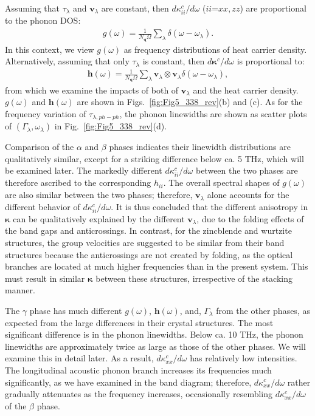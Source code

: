 \documentclass[twocolumn,amsmath,amssymb,a4paper,prb,superscriptaddress,floatfix]{revtex4-1}
\begin{document}
Assuming that $\tau_\lambda$ and $\mathbf{v}_\lambda$ are constant, then
$d\kappa_{ii}^c/d\omega$ ($ii$=$xx,zz$) are proportional to the phonon
DOS: 
\begin{align}
 \label{eq:dos}
 g(\omega) = \frac{1}{N_\mathbf{q}\Omega}
 \sum_\lambda
 \delta(\omega-\omega_{\lambda}).
\end{align}
In this context, we view $g(\omega)$ as frequency distributions of heat
carrier density. Alternatively, assuming that only $\tau_\lambda$ is constant,
then $d\boldsymbol{\kappa}^c/d\omega$ is proportional to:
\begin{align}
 \label{eq:wdos}
 \boldsymbol{h}(\omega) = \frac{1}{N_\mathbf{q}\Omega}
 \sum_\lambda
 \mathbf{v}_\lambda \otimes \mathbf{v}_\lambda
 \delta(\omega-\omega_{\lambda}),
\end{align}
from which we examine the impacts of both of $\mathbf{v}_\lambda$ and the heat carrier
density. $g(\omega)$ and  $\boldsymbol{h}(\omega)$
are shown in
Figs.~\ref{fig:Fig5_338_rev}(b) and (c). As for the frequency
variation of $\tau_{\lambda,ph-ph}$, the phonon linewidths are shown as scatter
plots of $(\Gamma_\lambda,\omega_\lambda)$ in Fig.~\ref{fig:Fig5_338_rev}(d).

Comparison of the $\alpha$ and $\beta$ phases indicates their linewidth
distributions are qualitatively similar, except for a striking difference below
ca. 5 THz, which will be examined later. The markedly different
$d\kappa_{ii}^c/d\omega$ between the two phases are therefore ascribed to the
corresponding $h_{ii}$. The overall spectral shapes of $g(\omega)$ are also
similar between the two phases; therefore, $\mathbf{v}_\lambda$ alone accounts
for the different behavior of $d\kappa_{ii}^c/d\omega$. It is thus concluded
that the different anisotropy in $\boldsymbol{\kappa}$ can be qualitatively
explained by the different $\mathbf{v}_\lambda$, due to the folding effects of
the band gaps and anticrossings. In contrast, for the zincblende and wurtzite
structures, the group velocities are suggested to be similar from their band
structures\cite{phono3py} because the anticrossings are not created by folding,
as the optical branches are located at much higher frequencies than in the
present system. This must result in similar $\boldsymbol{\kappa}$ between these
structures, irrespective of the stacking manner. 

The $\gamma$ phase has much different $g(\omega)$, $\boldsymbol{h}(\omega)$,
and, $\Gamma_\lambda$ from the other phases, as expected from the large
differences in their crystal structures. The most significant difference is in
the phonon linewidths. Below ca. 10 THz, the phonon linewidths are approximately
twice as large as those of the other phases. We will examine this in detail
later. As a result, $d\kappa_{xx}^c/d\omega$ has relatively low intensities. The
longitudinal acoustic phonon branch increases its frequencies much
significantly, as we have examined in the band diagram; therefore,
$d\kappa_{xx}^c/d\omega$ rather gradually attenuates as the frequency increases,
occasionally resembling $d\kappa_{xx}^c/d\omega$ of the $\beta$ phase.
\end{document}

